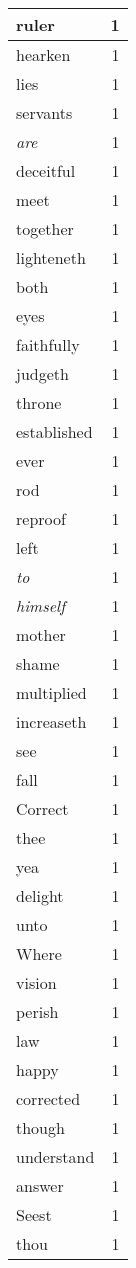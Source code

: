 \begin{center}
\begin{longtable}{l|r}
ruler & 1\\ \hline 
hearken & 1\\ \hline 
lies & 1\\ \hline 
servants & 1\\ \hline 
\emph{are} & 1\\ \hline 
deceitful & 1\\ \hline 
meet & 1\\ \hline 
together & 1\\ \hline 
lighteneth & 1\\ \hline 
both & 1\\ \hline 
eyes & 1\\ \hline 
faithfully & 1\\ \hline 
judgeth & 1\\ \hline 
throne & 1\\ \hline 
established & 1\\ \hline 
ever & 1\\ \hline 
rod & 1\\ \hline 
reproof & 1\\ \hline 
left & 1\\ \hline 
\emph{to} & 1\\ \hline 
\emph{himself} & 1\\ \hline 
mother & 1\\ \hline 
shame & 1\\ \hline 
multiplied & 1\\ \hline 
increaseth & 1\\ \hline 
see & 1\\ \hline 
fall & 1\\ \hline 
Correct & 1\\ \hline 
thee & 1\\ \hline 
yea & 1\\ \hline 
delight & 1\\ \hline 
unto & 1\\ \hline 
Where & 1\\ \hline 
vision & 1\\ \hline 
perish & 1\\ \hline 
law & 1\\ \hline 
happy & 1\\ \hline 
corrected & 1\\ \hline 
though & 1\\ \hline 
understand & 1\\ \hline 
answer & 1\\ \hline 
Seest & 1\\ \hline 
thou & 1\\ \hline 

\end{longtable}
\end{center}
